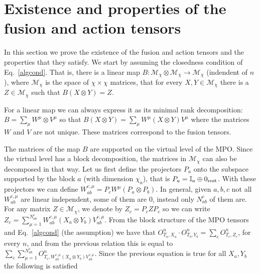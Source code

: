 \documentclass[a4paper,twocolumn,11pt,accepted=2023-02-10]{quantumarticle}
\newcommand{\id}{\mathbb{I}}
\begin{document}
\appendix
\section{Existence and properties of the fusion and action tensors}\label{ap:proofs}

In this section we prove the existence of the fusion and action tensors and the properties that they satisfy. We start by assuming the closedness condition of Eq.\ \eqref{algcond}. That is, there is a linear map $B: \mathcal{M}_\chi \otimes \mathcal{M}_\chi \to \mathcal{M}_\chi$ (indendent of $n$), where $\mathcal{M}_\chi$ is the space of $ \chi \times \chi$ matrices, that for every $X,Y \in \mathcal{M}_\chi$ there is a $Z \in \mathcal{M}_\chi$ such that $B(X\otimes Y) = Z$. 

For a linear map we can always express it as its minimal rank decomposition: $B=\sum_\mu W^\mu \otimes V^\mu$ so that $B(X\otimes Y)= \sum_\mu W^\mu (X\otimes Y) V^\mu$ where the matrices $W$ and $V$ are not unique. These matrices correspond to the fusion tensors.

The matrices of the map $B$ are supported on the virtual level of the MPO. Since the virtual level has a block decomposition, the matrices in $\mathcal{M}_\chi$ can also be decomposed in that way. Let us first define the projectors $P_a$ onto the subspace supported by the block $a$ (with dimension $\chi_a$), that is $P_a=\id_a\oplus 0_{\rm rest}$. With these projectors we can define $W_{ab}^{c,\mu} = P_cW^\mu (P_a\otimes P_b)$. In general, given $a,b,c$ not all $W_{ab}^{c,\mu}$ are linear independent, some of them are $0$, instead only $N_{ab}^c$ of them are. For any matrix $Z\in \mathcal{M}_\chi$, we denote by $Z_c= P_c Z P_c$ so we can write $Z_c =  \sum_{\mu=1}^{N_{ab}^c} W_{ab}^{c,\mu}(X_a\otimes Y_b) V_{ab}^{c,\mu}$. From the block structure of the MPO tensors and Eq.\ \eqref{algcond} (the assumption) we have that $O^n_{T_a,X_a}  {\cdot} O^n_{T_b,Y_b} = \sum_c O^n_{T_c,Z_c}$, for every $n$, and from the previous relation this is equal to $ \sum_c  \sum_{\mu=1}^{N_{ab}^c}  O^n_{T_c,W_{ab}^{c,\mu}(X_a\otimes Y_b) V_{ab}^{c,\mu}} $. Since the previous equation is true for all $X_a,Y_b$ the following is satisfied
\end{document}

